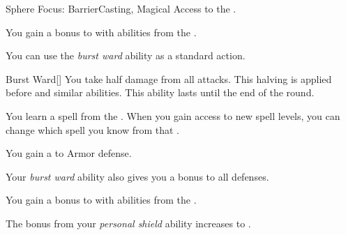    \begin{feat}{Sphere Focus: Barrier}{Casting, Magical}
        \featpre Access to the  .

         You gain a  bonus to  with abilities from the  .

         You can use the \textit{burst ward} ability as a standard action.
        \begin{freeability}{Burst Ward}[]
            You take half damage from all attacks.
            This halving is applied before  and similar abilities.
            This ability lasts until the end of the round.
        \end{freeability}

         You learn a spell from the  .
        When you gain access to new spell levels, you can change which spell you know from that .

         You gain a   to Armor defense.

         Your \textit{burst ward} ability also gives you a  bonus to all defenses.

         You gain a  bonus to  with abilities from the  .

         The bonus from your \textit{personal shield} ability increases to .
    \end{feat}

